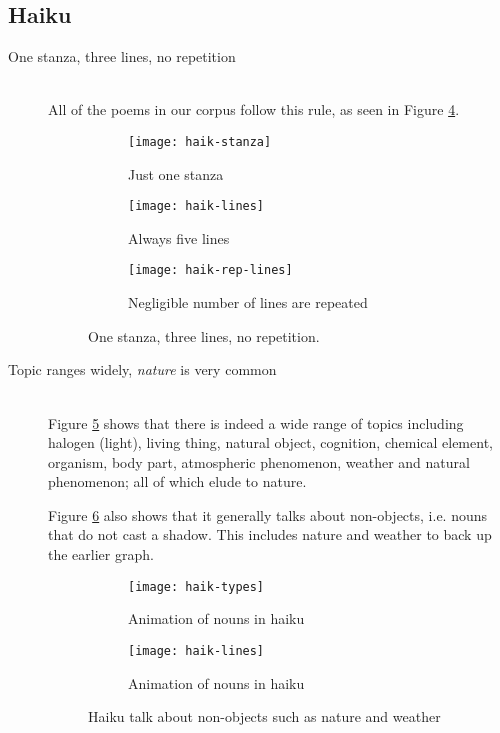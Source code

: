 \subsection{Haiku}

\begin{description}
\item[One stanza, three lines, no repetition]  \hfill \\
All of the poems in our corpus follow this rule, as seen in Figure \ref{fig:haik1}.

\begin{figure}[H]
\centering
\begin{subfigure}[t]{0.3\textwidth}
	\centering
    \texttt{[image: haik-stanza]}
    \caption{Just one stanza}
    \label{fig:haik-stanza}
\end{subfigure}
\begin{subfigure}[t]{0.3\textwidth}
	\centering
    \texttt{[image: haik-lines]}
    \caption{Always five lines}
    \label{fig:haik-lines}
\end{subfigure}
\begin{subfigure}[t]{0.3\textwidth}
	\centering
    \texttt{[image: haik-rep-lines]}
    \caption{Negligible number of lines are repeated}
    \label{fig:haik-rep-lines}
\end{subfigure}
\caption{One stanza, three lines, no repetition.}
\label{fig:haik1}
\end{figure}

\item[Topic ranges widely, \textit{nature} is very common]  \hfill \\
Figure \ref{fig:haik-types} shows that there is indeed a wide range of topics including halogen (light), living thing, natural object, cognition, chemical element, organism, body part, atmospheric phenomenon, weather and natural phenomenon; all of which elude to nature. 

Figure \ref{fig:haik-anim} also shows that it generally talks about non-objects, i.e. nouns that do not cast a shadow. This includes nature and weather to back up the earlier graph.

\begin{figure}[H]
\centering
\begin{subfigure}[t]{0.9\textwidth}
	\centering
    \texttt{[image: haik-types]}
    \caption{Animation of nouns in haiku}
    \label{fig:haik-types}
\end{subfigure}
\begin{subfigure}[t]{0.9\textwidth}
	\centering
    \texttt{[image: haik-lines]}
    \caption{Animation of nouns in haiku}
    \label{fig:haik-anim}
\end{subfigure}
\caption{Haiku talk about non-objects such as nature and weather}
\label{fig:haik2}
\end{figure}


\end{description}
